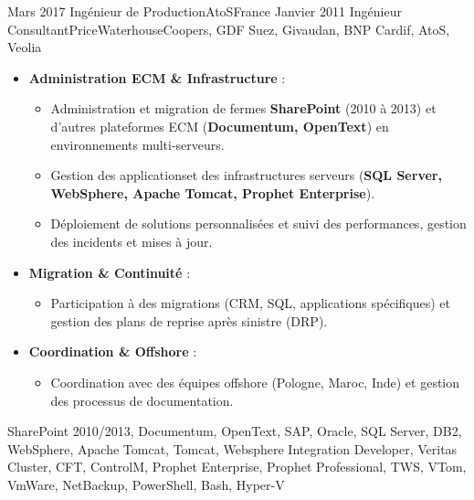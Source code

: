 \begin{experiences}
\emptySeparator
\emptySeparator

\consultantexperience
    {Mars 2017}       {Ingénieur de Production}{AtoS}{France}
    {Janvier 2011}    {Ingénieur Consultant}{PriceWaterhouseCoopers, GDF Suez, Givaudan, BNP Cardif, AtoS, Veolia} {
        \begin{itemize}[left=0pt,label={},itemsep=0.4em]

          \item \textbf{Administration ECM \& Infrastructure} :
            \begin{itemize}[itemsep=0.15em,topsep=0.1em,parsep=0pt]
              \small
              \item Administration et migration de fermes \textbf{SharePoint} (2010 à 2013) et d'autres plateformes ECM (\textbf{Documentum, OpenText}) en environnements multi-serveurs.
              \item Gestion des applicationset des infrastructures serveurs (\textbf{SQL Server, WebSphere, Apache Tomcat, Prophet Enterprise}).
              \item Déploiement de solutions personnalisées et suivi des performances, gestion des incidents et mises à jour.
            \end{itemize}

          \vspace{0.2em}

          \item \textbf{Migration \& Continuité} :
            \begin{itemize}[itemsep=0.15em,topsep=0.1em,parsep=0pt]
              \small
              \item Participation à des migrations (CRM, SQL, applications spécifiques) et gestion des plans de reprise après sinistre (DRP).
            \end{itemize}

          \vspace{0.2em}

          \item \textbf{Coordination \& Offshore} :
            \begin{itemize}[itemsep=0.15em,topsep=0.1em,parsep=0pt]
              \small
              \item Coordination avec des équipes offshore (Pologne, Maroc, Inde) et gestion des processus de documentation.
            \end{itemize}

        \end{itemize}
    }
    {SharePoint 2010/2013, Documentum, OpenText, SAP, Oracle, SQL Server, DB2, WebSphere, Apache Tomcat, Tomcat, Websphere Integration Developer, Veritas Cluster, CFT, ControlM, Prophet Enterprise, Prophet Professional, TWS, VTom, VmWare, NetBackup, PowerShell, Bash, Hyper-V}
\emptySeparator



\end{experiences}
